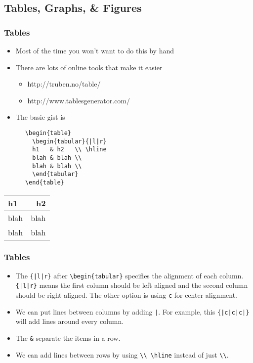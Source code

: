 \documentclass{beamer}
\begin{document}
\subsection{Tables, Graphs, \& Figures}
\begin{frame}[fragile]
	\frametitle{Tables}
  \begin{itemize}
    \item Most of the time you won't want to do this by hand
    \item There are lots of online tools that make it easier
      \begin{itemize}
        \item http://truben.no/table/
        \item http://www.tablesgenerator.com/
      \end{itemize}
    \item The basic gist is
  \end{itemize}

  \begin{multicols}{2}
    \begin{verbatim}
      \begin{table}
        \begin{tabular}{|l|r}
        h1   & h2   \\ \hline
        blah & blah \\
        blah & blah \\
        \end{tabular}
      \end{table}
    \end{verbatim}
    \columnbreak
    \begin{table}
      \begin{tabular}{|l|r}
      h1   & h2   \\ \hline
      blah & blah \\
      blah & blah \\
      \end{tabular}
    \end{table}
  \end{multicols}
\end{frame}
\begin{frame}[fragile]
  \frametitle{Tables}
  \begin{itemize}
    \item The \verb.{|l|r}. after \verb.\begin{tabular}. specifies the alignment of each column. \verb.{|l|r}. means the first column should be left aligned and the second column should be right aligned. The other option is using \verb.c. for center alignment.
    \item We can put lines between columns by adding \verb.|.. For example, this \verb.{|c|c|c|}. will add lines around every column.
    \item The \verb.&. separate the items in a row.
    \item We can add lines between rows by using \verb.\\ \hline. instead of just \verb.\\..
  \end{itemize}
\end{frame}
\end{document}
